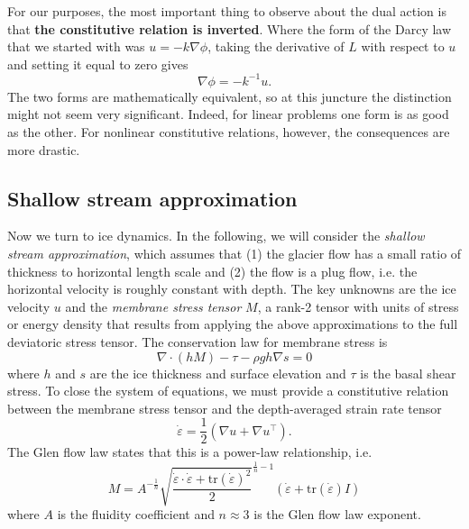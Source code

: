 \documentclass{article}
\theoremstyle{definition}
\theoremstyle{plain}
\begin{document}
For our purposes, the most important thing to observe about the dual action is that \textbf{the constitutive relation is inverted}.
Where the form of the Darcy law that we started with was $u = -k\nabla\phi$, taking the derivative of $L$ with respect to $u$ and setting it equal to zero gives
\begin{equation}
    \nabla\phi = -k^{-1}u.
\end{equation}
The two forms are mathematically equivalent, so at this juncture the distinction might not seem very significant.
Indeed, for linear problems one form is as good as the other.
For nonlinear constitutive relations, however, the consequences are more drastic.

\subsection{Shallow stream approximation}
Now we turn to ice dynamics.
In the following, we will consider the \emph{shallow stream approximation}, which assumes that (1) the glacier flow has a small ratio of thickness to horizontal length scale and (2) the flow is a plug flow, i.e. the horizontal velocity is roughly constant with depth.
The key unknowns are the ice velocity $u$ and the \emph{membrane stress tensor} $M$, a rank-2 tensor with units of stress or energy density that results from applying the above approximations to the full deviatoric stress tensor.
The conservation law for membrane stress is
\begin{equation}
    \nabla\cdot (hM) - \tau - \rho gh\nabla s = 0
    \label{eq:membrane-stress-conservation}
\end{equation}
where $h$ and $s$ are the ice thickness and surface elevation and $\tau$ is the basal shear stress.
To close the system of equations, we must provide a constitutive relation between the membrane stress tensor and the depth-averaged strain rate tensor
\begin{equation}
    \dot\varepsilon = \frac{1}{2}\left(\nabla u + \nabla u^\top\right).
    \label{eq:strain-rate}
\end{equation}
The Glen flow law states that this is a power-law relationship, i.e.
\begin{equation}
    M = A^{-\frac{1}{n}}\sqrt{\frac{\dot\varepsilon\cdot\dot\varepsilon + \text{tr}(\dot\varepsilon)^2}{2}}^{\frac{1}{n} - 1}\left(\dot\varepsilon + \text{tr}(\dot\varepsilon)I\right)
    \label{eq:constitutive-relation}
\end{equation}
where $A$ is the fluidity coefficient and $n \approx 3$ is the Glen flow law exponent.
\end{document}
